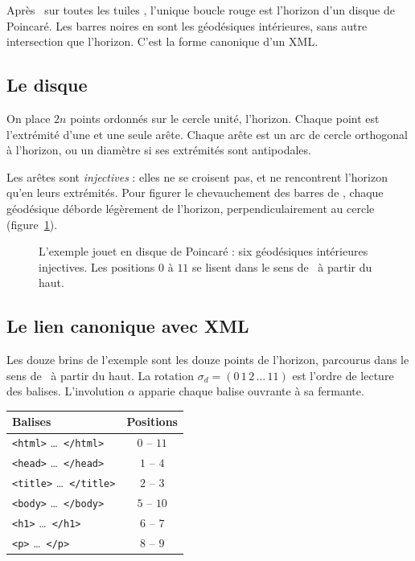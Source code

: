 \documentclass[11pt,a4paper]{article}
\theoremstyle{remark}
\newcommand{\balise}[1]{\texttt{#1}}
\newcommand{\fig}[1]{}
\begin{document}
Après \papin\ sur toutes les tuiles \CONNECT, l'unique boucle rouge est l'horizon
d'un disque de Poincaré. Les barres noires en sont les géodésiques intérieures,
sans autre intersection que l'horizon. C'est la forme canonique d'un XML.

\subsection{Le disque}

On place $2n$ points ordonnés sur le cercle unité, l'horizon. Chaque point est
l'extrémité d'une et une seule arête. Chaque arête est un arc de cercle
orthogonal à l'horizon, ou un diamètre si ses extrémités sont antipodales.

Les arêtes sont \emph{injectives} : elles ne se croisent pas, et ne rencontrent
l'horizon qu'en leurs extrémités. Pour figurer le chevauchement des barres de
\CONNECT, chaque géodésique déborde légèrement de l'horizon, perpendiculairement
au cercle (figure~\ref{f:poincare}).

\begin{figure}[ht]
  \centering
  \fig{fig-poincare}
  \caption{L'exemple jouet en disque de Poincaré : six géodésiques intérieures
    injectives. Les positions $0$ à $11$ se lisent dans le sens de \spin\ à
    partir du haut.}
  \label{f:poincare}
\end{figure}

\subsection{Le lien canonique avec XML}

Les douze brins de l'exemple sont les douze points de l'horizon, parcourus dans
le sens de \spin\ à partir du haut. La rotation $\sigma_d=(0\,1\,2\,\dots\,11)$
est l'ordre de lecture des balises. L'involution $\alpha$ apparie chaque balise
ouvrante à sa fermante.

\begin{center}
\begin{tabular}{@{}lc@{}}
  \toprule
  Balises & Positions \\
  \midrule
  \balise{<html>} \dots\ \balise{</html>}   & $0$ -- $11$ \\
  \balise{<head>} \dots\ \balise{</head>}   & $1$ -- $4$ \\
  \balise{<title>} \dots\ \balise{</title>} & $2$ -- $3$ \\
  \balise{<body>} \dots\ \balise{</body>}   & $5$ -- $10$ \\
  \balise{<h1>} \dots\ \balise{</h1>}       & $6$ -- $7$ \\
  \balise{<p>} \dots\ \balise{</p>}         & $8$ -- $9$ \\
  \bottomrule
\end{tabular}
\end{center}
\end{document}
